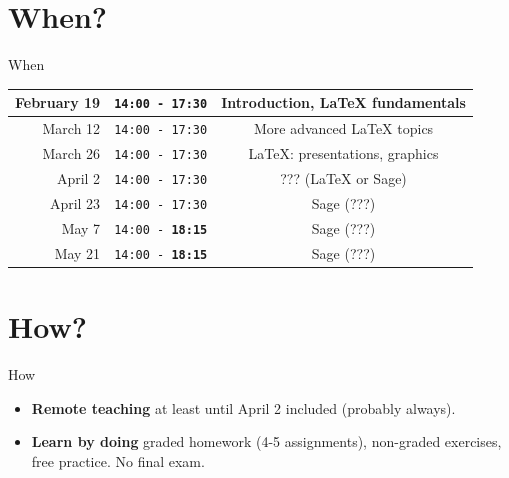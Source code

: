 \documentclass[11pt]{beamer}
\begin{document}
\section{When?}
\begin{frame}{When}
  \begin{tabular}{r|c|c}
    February 19 & \texttt{14:00 - 17:30} & Introduction, LaTeX fundamentals  \\
    \hline
    March 12    & \texttt{14:00 - 17:30} & More advanced LaTeX topics        \\
    \hline
    March 26    & \texttt{14:00 - 17:30} & LaTeX: presentations, graphics    \\
    \hline
    April 2     & \texttt{14:00 - 17:30} & ??? (LaTeX or Sage)               \\
    \hline
    April 23    & \texttt{14:00 - 17:30} & Sage (???)                        \\
    \hline
    May 7       & \texttt{14:00 - {\bf 18:15}} & Sage (???)                  \\
    \hline
    May 21      & \texttt{14:00 - {\bf 18:15}} & Sage (???)
  \end{tabular}
\end{frame}

\section{How?}
\begin{frame}{How}
  \begin{itemize}
    \item \textbf{Remote teaching} at least until April 2 included (probably
          always).
    \item \textbf{Learn by doing} graded homework (4-5 assignments), non-graded
          exercises, free practice. No final exam.
  \end{itemize}
\end{frame}
\end{document}
